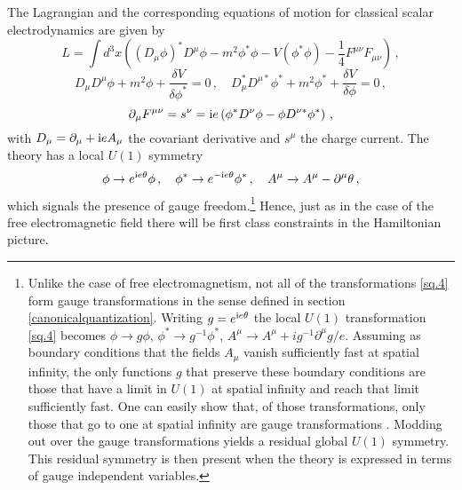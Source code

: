 \documentclass[12pt]{article}
\def\ii{\textrm i}
\begin{document}
The Lagrangian and the corresponding equations of motion for classical scalar electrodynamics are given by
\begin{equation}
L =  \int d^3 x \left((D_{\mu} \phi)^* D^{\mu} \phi - m^2\phi^*\phi - V(\phi^*\phi) - \frac{1}{4} F^{\mu \nu}F_{\mu \nu} \right) \,,
\label{sq.1}
\end{equation}
\begin{equation}
D_{\mu}D^{\mu}\phi + m^2 \phi + \frac{\delta V}{\delta\phi^* }= 0\,,\quad D^*_{\mu}D^{\mu*} \phi^* + m^2 \phi^* + \frac{\delta V}{\delta\phi } = 0\,,
\label{sq.2}
\end{equation}
\begin{equation}
\partial_{\mu} F^{\mu \nu}= s^{\nu} = \ii e\left(\phi^*D^{\nu}\phi - \phi D^{\nu*} \phi^* \right)\,,
\label{sq.3}
\end{equation}
with $D_{\mu}= \partial_{\mu} + \ii e A_{\mu}$ the covariant derivative and $s^{\mu}$ the charge current. The theory has a local $U(1)$ symmetry
\begin{equation}
\phi \to e^{\ii e \theta} \phi \,, \quad \phi^* \to e^{-\ii e \theta} \phi^*\,,\quad  A^{\mu} \to   A^\mu -  \partial^\mu  \theta\,, 
\label{sq.4}
\end{equation}
which signals the presence of gauge freedom.{\footnote{Unlike the case of free electromagnetism, not all of the transformations \eqref{sq.4} form gauge transformations in the sense defined in section \ref{canonicalquantization}. Writing $g=e^{\ii e \theta}$ the local $U(1)$ transformation \eqref{sq.4} becomes $\phi \to g \phi$, $\phi^* \to g^{-1} \phi^*$, $A^{\mu} \to   A^\mu + i g^{-1}  \partial^\mu g/e$. Assuming as boundary conditions that the fields $A_\mu$ vanish sufficiently fast at spatial infinity, the only functions $g$ that preserve these boundary conditions are those that have a limit in $U(1)$ at spatial infinity and reach that limit sufficiently fast. One can easily show that, of those transformations, only those that go to one at spatial infinity are gauge transformations \cite{struyve09c}. Modding out over the gauge transformations yields a residual global $U(1)$ symmetry. This residual symmetry is then present when the theory is expressed in terms of gauge independent variables.\label{sqedgauge}}} Hence, just as in the case of the free electromagnetic field there will be first class constraints in the Hamiltonian picture.
\end{document}
